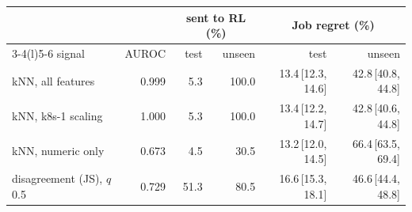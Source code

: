 \begin{tabular}{@{}lrrrrr@{}}
\toprule
&& \multicolumn{2}{c}{sent to RL (\%)} & \multicolumn{2}{c}{Job regret (\%)} \\
\cmidrule(lr){3-4}\cmidrule(l){5-6}
signal & AUROC & test & unseen & test & unseen \\
\midrule
kNN, all features & 0.999 & 5.3 & 100.0 & 13.4\,{\scriptsize[12.3, 14.6]} & 42.8\,{\scriptsize[40.8, 44.8]} \\
kNN, k8s-1 scaling & 1.000 & 5.3 & 100.0 & 13.4\,{\scriptsize[12.2, 14.7]} & 42.8\,{\scriptsize[40.6, 44.8]} \\
kNN, numeric only & 0.673 & 4.5 & 30.5 & 13.2\,{\scriptsize[12.0, 14.5]} & 66.4\,{\scriptsize[63.5, 69.4]} \\
disagreement (JS), $q$ 0.5 & 0.729 & 51.3 & 80.5 & 16.6\,{\scriptsize[15.3, 18.1]} & 46.6\,{\scriptsize[44.4, 48.8]} \\
\bottomrule
\end{tabular}

